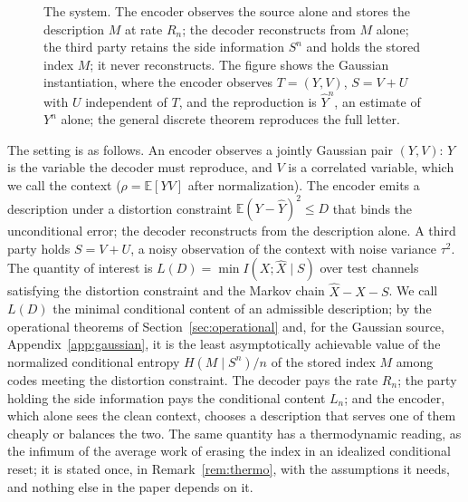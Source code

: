 \documentclass[11pt,onecolumn]{IEEEtran}
\newcommand{\E}{\mathbb{E}}
\newcommand{\hX}{\widehat{X}}
\newcommand{\hY}{\widehat{Y}}
\begin{document}
\begin{figure}[!t]
\centering
{}
\caption{The system. The encoder observes the source alone and stores
the description $M$ at rate $R_n$; the decoder reconstructs from $M$ alone;
the third party retains the side information $S^n$ and holds the stored
index $M$; it never reconstructs. The figure shows the Gaussian
instantiation, where the encoder observes $T=(Y,V)$, $S=V+U$ with $U$
independent of $T$, and
the reproduction is $\hY^n$, an estimate of $Y^n$ alone; the general
discrete theorem reproduces the full letter.}
\label{fig:system}
\end{figure}


The setting is as follows. An encoder observes a jointly Gaussian pair
$(Y,V)$: $Y$ is the variable the decoder must reproduce, and $V$ is a
correlated variable, which we call the context ($\rho=\E[YV]$ after
normalization). The encoder emits a description under a distortion constraint
$\E(Y-\hY)^2\le D$ that binds the unconditional error; the decoder
reconstructs from the description alone. A third
party holds $S=V+U$, a noisy observation of the context with noise variance
$\tau^2$. The quantity of interest is
$L(D)=\min I(X;\hX\mid S)$ over test channels satisfying the distortion
constraint and the Markov chain $\hX-X-S$. We call $L(D)$ the minimal
conditional content of an admissible description; by the operational
theorems of Section~\ref{sec:operational} and, for the Gaussian source,
Appendix~\ref{app:gaussian}, it is the least asymptotically achievable
value of the normalized conditional entropy $H(M\mid S^n)/n$ of the stored
index $M$ among codes meeting the distortion constraint. The decoder pays
the rate $R_n$; the party holding the side information pays the
conditional content $L_n$; and the encoder, which alone sees the clean
context, chooses a description that serves one of them cheaply or
balances the two. The same quantity has a thermodynamic reading, as the
infimum of the average work of erasing the index in an idealized
conditional reset; it is stated once, in Remark~\ref{rem:thermo}, with
the assumptions it needs, and nothing else in the paper depends on it.
\end{document}
